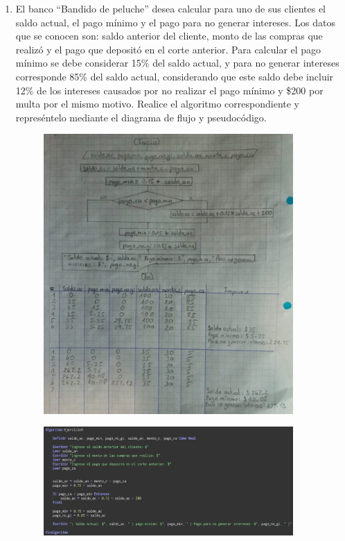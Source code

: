 \documentclass[12pt]{article}
\begin{document}
\begin{enumerate}
            \newpage
            \item El banco “Bandido de peluche” desea calcular para uno de sus clientes el saldo actual, el pago mínimo y el pago para no generar intereses. Los datos que se conocen son: saldo anterior del cliente, monto de las compras que realizó y el pago que depositó en el corte anterior. Para calcular el pago mínimo se debe considerar 15\% del saldo actual, y para no generar intereses corresponde 85\% del saldo actual, considerando que este saldo debe incluir 12\% de los intereses causados por no realizar el pago mínimo y \$200 por multa por el mismo motivo. Realice el algoritmo correspondiente y represéntelo mediante el diagrama de flujo y pseudocódigo.
            
                \begin{figure}[!h]
                    \centering
                    \includegraphics[width=0.9\textwidth]{Img/DF_ej9.jpeg}
                \end{figure}

                \newpage
                \begin{figure}[!h]
                    \centering
                    \includegraphics[width=0.9\textwidth]{Img/Cod_ej9.png}
                \end{figure}


\end{enumerate}
\end{document}
